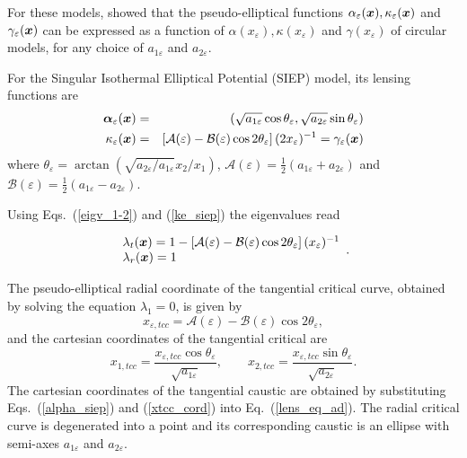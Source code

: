 \documentclass[useAMS,usenatbib]{mn2e}
\begin{document}
For these models, \citet{dm_2011} showed that the pseudo-elliptical functions $\alpha_\varepsilon(\bmath{x}),\kappa_\varepsilon(\bmath{x})$ and $\gamma_\varepsilon(\bmath{x})$ can be expressed as a function of $\alpha(x_\varepsilon), \kappa(x_\varepsilon) $ and $\gamma(x_\varepsilon)$ of circular models, for any choice of $a_{1\varepsilon}$ and $a_{2\varepsilon}$.

For the  Singular Isothermal Elliptical Potential (SIEP) model, its lensing functions are
\begin{eqnarray}
\bmath{\alpha}_\varepsilon(\bmath{x}) & = & (\sqrt{a_{1\varepsilon}
} \cos { \theta_ \varepsilon},\sqrt{a_{2\varepsilon}}\sin{\theta_\varepsilon})\label{alpha_siep}\\
\kappa_\varepsilon(\bmath{x}) & = &
\left[\mathcal{A}(\varepsilon)-\mathcal{B}(\varepsilon)\cos{2\theta_\varepsilon}
\right](2 x_\varepsilon)^{-1}=\gamma_\varepsilon(\bmath{x}) \label{ke_siep}
\end{eqnarray}
\noindent where $\theta_\varepsilon=\arctan{(\sqrt{a_{2\varepsilon}/a_{1\varepsilon}}x_2/x_1)}$, $\mathcal{A(\varepsilon)}=\frac{1}{2}(a_{1\varepsilon}+a_{2\varepsilon})$ and
$\mathcal{B}(\varepsilon)=\frac{1}{2}(a_{1\varepsilon}-a_{2\varepsilon})$.

\noindent Using Eqs.~(\ref{eigv_1-2}) and (\ref{ke_siep}) the eigenvalues read

\begin{equation}\label{eigv_siep} 
\begin{array}{l}
\lambda_{t}(\bmath{x})= 1-\left[\mathcal{A}(\varepsilon)-\mathcal{B}(\varepsilon)\cos{2\theta_\varepsilon } \right](x_\varepsilon)^{-1}\\
\lambda_{r}(\bmath{x})= 1
\end{array}.
\end{equation}

\noindent The pseudo-elliptical radial coordinate of the tangential critical curve, obtained by solving the equation $\lambda_{1}=0$, is given by
\begin{equation}
x_{\varepsilon,tcc}= \mathcal{A}(\varepsilon)-\mathcal{B}(\varepsilon)\cos{2\theta_\varepsilon},
\end{equation}
and the cartesian coordinates of the tangential critical are
\begin{equation}
x_{1,tcc}=\frac{x_{\varepsilon,tcc}\cos{\theta_\varepsilon}}{\sqrt{a_{1\varepsilon}}},\qquad x_{2,tcc}=\frac{x_{\varepsilon,tcc}\sin{\theta_\varepsilon}}{\sqrt{a_{2\varepsilon}}}. \label{xtcc_cord}
\end{equation}
\noindent The cartesian coordinates of the tangential caustic are obtained by substituting Eqs.~(\ref{alpha_siep}) and (\ref{xtcc_cord}) into Eq.~(\ref{lens_eq_ad}). The radial critical curve is degenerated into a point and its corresponding caustic is an ellipse with semi-axes $a_{1\varepsilon}$ and $a_{2\varepsilon}$.
\end{document}
